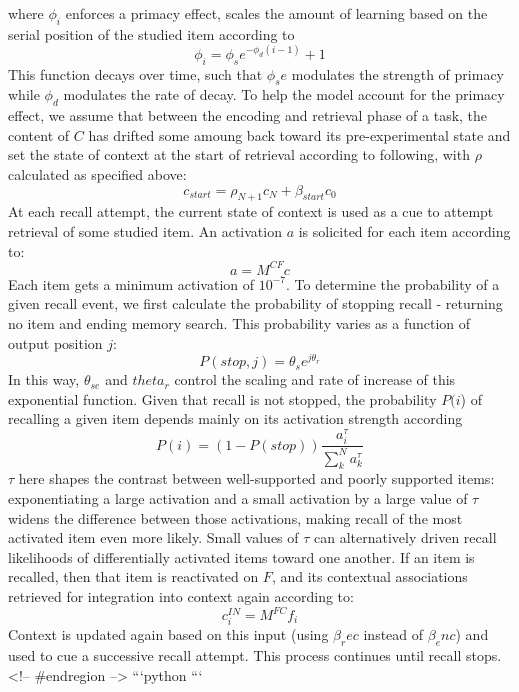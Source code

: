 {}where $\phi_i$ enforces a primacy effect, scales the amount of learning based on the serial position of the studied item according to\markdownRendererInterblockSeparator
{}$$\phi_i = \phi_se^{-\phi_d(i-1)} + 1$$\markdownRendererInterblockSeparator
{}This function decays over time, such that $\phi_se$ modulates the strength of primacy while $\phi_d$ modulates the rate of decay.\markdownRendererInterblockSeparator
{}\markdownRendererInterblockSeparator
{}To help the model account for the primacy effect, we assume that between the encoding and retrieval phase of a task, the content of $C$ has drifted some amoung back toward its pre-experimental state and set the state of context at the start of retrieval according to following, with $\rho$ calculated as specified above:\markdownRendererInterblockSeparator
{}$$c_{start} = \rho_{N+1}c_N + \beta_{start}c_0$$\markdownRendererInterblockSeparator
{}At each recall attempt, the current state of context is used as a cue to attempt retrieval of some studied item. An activation $a$ is solicited for each item according to:\markdownRendererInterblockSeparator
{}$$a = M^{CF}c$$\markdownRendererInterblockSeparator
{}Each item gets a minimum activation of $10^{-7}$. To determine the probability of a given recall event, we first calculate the probability of stopping recall - returning no item and ending memory search. This probability varies as a function of output position $j$:\markdownRendererInterblockSeparator
{}$$P(stop, j) = \theta_se^{j\theta_r}$$\markdownRendererInterblockSeparator
{}In this way, $\theta_{se}$ and $theta_r$ control the scaling and rate of increase of this exponential function. Given that recall is not stopped, the probability $P(i$) of recalling a given item depends mainly on its activation strength according\markdownRendererInterblockSeparator
{}$$P(i) = (1-P(stop))\frac{a^{\tau}_i}{\sum_{k}^{N}a^{\tau}_k}$$\markdownRendererInterblockSeparator
{}$\tau$ here shapes the contrast between well-supported and poorly supported items: exponentiating a large activation and a small activation by a large value of $\tau$ widens the difference between those activations, making recall of the most activated item even more likely. Small values of $\tau$ can alternatively driven recall likelihoods of differentially activated items toward one another.\markdownRendererInterblockSeparator
{}If an item is recalled, then that item is reactivated on $F$, and its contextual associations retrieved for integration into context again according to:\markdownRendererInterblockSeparator
{}$$c^{IN}_{i} = M^{FC}f_{i}$$\markdownRendererInterblockSeparator
{}Context is updated again based on this input (using $\beta_rec$ instead of $\beta_enc$) and used to cue a successive recall attempt. This process continues until recall stops. <!-- #endregion -->\markdownRendererInterblockSeparator
{}```python\markdownRendererInterblockSeparator
{}```\relax